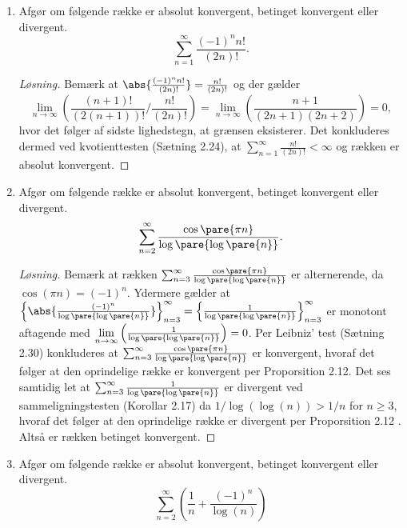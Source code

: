 \setcounter{section}{2}
\begin{opg}\hfill
\begin{enumerate}
    \item Afgør om følgende række er absolut konvergent, betinget konvergent eller divergent.
    $$ \sum_{n=1}^\infty \frac{(-1)^n n! }{(2n)!}. $$
    \ifanswers
    \begin{proof}[Løsning]
    	Bemærk at $ \abs{\frac{(-1)^n n! }{(2n)!}}=\frac{ n! }{(2n)!} $ og der gælder \begin{equation*}
    	\lim\limits_{n\to\infty}\left(\frac{ (n+1)! }{(2(n+1))!}\Bigg/\frac{ n! }{(2n)!}\right)=\lim\limits_{n\to\infty}\left(\frac{n+1}{(2n+1)(2n+2)}\right)=0,
    	\end{equation*}
    	hvor det følger af sidste lighedstegn, at grænsen eksisterer. Det konkluderes dermed ved kvotienttesten (Sætning 2.24), at $ \sum_{n=1}^\infty \frac{ n! }{(2n)!}<\infty $ og rækken er absolut konvergent.
    \end{proof}
    \fi
    
    \item Afgør om følgende række er absolut konvergent, betinget konvergent eller divergent.
    $$ \sum_{n=2}^\infty
        \frac{\cos\pare{\pi n}}{\log\pare{\log\pare{n}}}.  $$
        \ifanswers
        \begin{proof}[Løsning]
        	Bemærk at rækken $ \sum_{n=3}^{\infty}\frac{\cos\pare{\pi n}}{\log\pare{\log\pare{n}}} $ er alternerende, da $ \cos(\pi n)=(-1)^n $.
        	Ydermere gælder at $ \left\{\abs{\frac{(-1)^n}{\log\pare{\log\pare{n}}}}\right\}_{n=3}^\infty=\left\{\frac{1}{\log\pare{\log\pare{n}}}\right\}_{n=3}^\infty $ er monotont aftagende med $\lim\limits_{n\to\infty}\left(\frac{1}{\log\pare{\log\pare{n}}}\right)= 0 $. Per Leibniz' test (Sætning 2.30) konkluderes at $ \sum_{n=3}^\infty
        	\frac{\cos\pare{\pi n}}{\log\pare{\log\pare{n}}} $ er konvergent, hvoraf det følger at den oprindelige række er konvergent per Proporsition 2.12. Det ses samtidig let at $ \sum_{n=3}^{\infty}\frac{1}{\log\pare{\log\pare{n}}} $ er divergent ved sammeligningstesten (Korollar 2.17) da $ 1/\log(\log(n))>1/n $ for $ n\geq 3 $, hvoraf det følger at den oprindelige række er divergent per Proporsition 2.12	. Altså er rækken betinget konvergent.
        \end{proof}
        \fi
    \item Afgør om følgende række er absolut konvergent, betinget konvergent eller divergent.
    $$
    \sum_{n=2}^{\infty}\left(\frac{1}{n}+\frac{(-1)^n}{\log(n)}\right)
    $$
    

\end{enumerate}
\end{opg}
